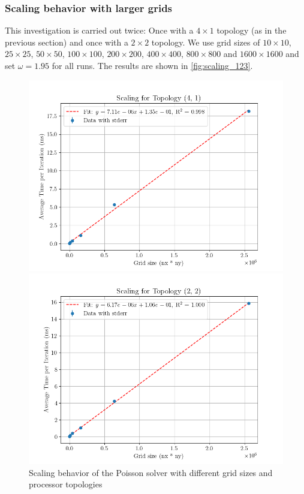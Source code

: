 \subsubsection{Scaling behavior with larger grids}
\label{subsec:scaling}
This investigation is carried out twice: Once with a $4\times 1$ topology (as in the previous section) and once with a $2\times 2$ topology. We use grid sizes of $10\times 10$, $25\times 25$, $50\times 50$, $100\times 100$, $200\times 200$, $400\times 400$, $800\times 800$ and $1600\times 1600$ and set $\omega = 1.95$ for all runs. The results are shown in \autoref{fig:scaling_123}.

\begin{figure}[H]
    \centering
    \begin{minipage}{0.48\textwidth}
        \centering
        \includegraphics[width=\linewidth]{../fig/lab1/scaling_topology_4x1.png}
    \end{minipage}%
    \hspace{0.02\textwidth}
    \begin{minipage}{0.48\textwidth}
        \centering
        \includegraphics[width=\linewidth]{../fig/lab1/scaling_topology_2x2.png}
    \end{minipage}
    \caption{Scaling behavior of the Poisson solver with different grid sizes and processor topologies}
    \label{fig:scaling_123}
\end{figure}
